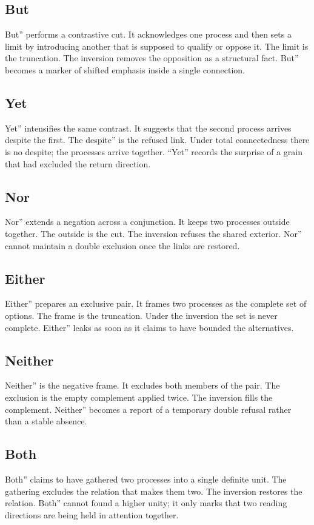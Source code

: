 \documentclass[11pt,a4paper]{article}
\begin{document}
\subsection{But} But'' performs a contrastive cut. It acknowledges one process and then sets a limit by introducing another that is supposed to qualify or oppose it. The limit is the truncation. The inversion removes the opposition as a structural fact. But'' becomes a marker of shifted emphasis inside a single connection.

\subsection{Yet} Yet'' intensifies the same contrast. It suggests that the second process arrives despite the first. The despite'' is the refused link. Under total connectedness there is no despite; the processes arrive together. ``Yet'' records the surprise of a grain that had excluded the return direction.

\subsection{Nor} Nor'' extends a negation across a conjunction. It keeps two processes outside together. The outside is the cut. The inversion refuses the shared exterior. Nor'' cannot maintain a double exclusion once the links are restored.

\subsection{Either} Either'' prepares an exclusive pair. It frames two processes as the complete set of options. The frame is the truncation. Under the inversion the set is never complete. Either'' leaks as soon as it claims to have bounded the alternatives.

\subsection{Neither} Neither'' is the negative frame. It excludes both members of the pair. The exclusion is the empty complement applied twice. The inversion fills the complement. Neither'' becomes a report of a temporary double refusal rather than a stable absence.

\subsection{Both} Both'' claims to have gathered two processes into a single definite unit. The gathering excludes the relation that makes them two. The inversion restores the relation. Both'' cannot found a higher unity; it only marks that two reading directions are being held in attention together.
\end{document}
